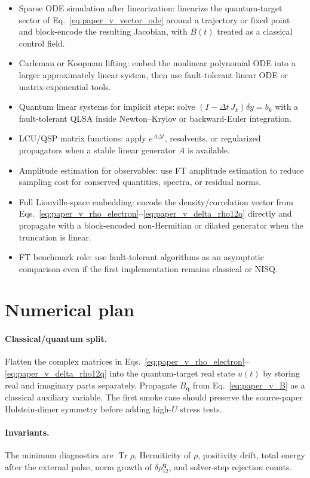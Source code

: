 \documentclass[
  reprint,
  amsmath,
  amssymb,
  aps,
  pra,
  nofootinbib,
  superscriptaddress,
  floatfix
]{revtex4-2}
\newcommand{\Tr}{\operatorname{Tr}}
\begin{document}
\begin{itemize}
\item Sparse ODE simulation after linearization: linearize the quantum-target sector of Eq.~\eqref{eq:paper_v_vector_ode} around a trajectory or fixed point and block-encode the resulting Jacobian, with \(B(t)\) treated as a classical control field.
\item Carleman or Koopman lifting: embed the nonlinear polynomial ODE into a larger approximately linear system, then use fault-tolerant linear ODE or matrix-exponential tools.
\item Quantum linear systems for implicit steps: solve \((I-\Delta t\,J_k)\delta y=b_k\) with a fault-tolerant QLSA inside Newton--Krylov or backward-Euler integration.
\item LCU/QSP matrix functions: apply \(e^{A\Delta t}\), resolvents, or regularized propagators when a stable linear generator \(A\) is available.
\item Amplitude estimation for observables: use FT amplitude estimation to reduce sampling cost for conserved quantities, spectra, or residual norms.
\item Full Liouville-space embedding: encode the density/correlation vector from Eqs.~\eqref{eq:paper_v_rho_electron}--\eqref{eq:paper_v_delta_rho12q} directly and propagate with a block-encoded non-Hermitian or dilated generator when the truncation is linear.
\item FT benchmark role: use fault-tolerant algorithms as an asymptotic comparison even if the first implementation remains classical or NISQ.
\end{itemize}

\section{Numerical plan}

\paragraph*{Classical/quantum split.}
Flatten the complex matrices in Eqs.~\eqref{eq:paper_v_rho_electron}--\eqref{eq:paper_v_delta_rho12q} into the quantum-target real state \(u(t)\) by storing real and imaginary parts separately. Propagate \(B_{\mathbf q}\) from Eq.~\eqref{eq:paper_v_B} as a classical auxiliary variable. The first smoke case should preserve the source-paper Holstein-dimer symmetry before adding high-\(U\) stress tests.

\paragraph*{Invariants.}
The minimum diagnostics are \(\Tr\rho\), Hermiticity of \(\rho\), positivity drift, total energy after the external pulse, norm growth of \(\delta\rho^{\mathbf q}_{12}\), and solver-step rejection counts.
\end{document}
